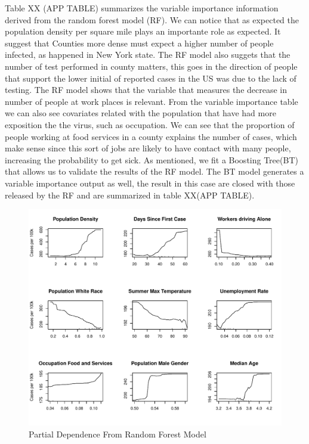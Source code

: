 \documentclass[
]{article}
\begin{document}
Table XX (APP TABLE) summarizes the variable importance information
derived from the random forest model (RF). We can notice that as
expected the population density per square mile plays an importante role
as expected. It suggest that Counties more dense must expect a higher
number of people infected, as happened in New York state. The RF model
also suggets that the number of test performed in county matters, this
goes in the direction of people that support the lower initial of
reported cases in the US was due to the lack of testing. The RF model
shows that the variable that measures the decrease in number of people
at work places is relevant. From the variable importance table we can
also see covariates related with the population that have had more
exposition the the virus, such as occupation. We can see that the
proportion of people working at food services in a county explains the
number of cases, which make sense since this sort of jobs are likely to
have contact with many people, increasing the probability to get sick.
As mentioned, we fit a Boosting Tree(BT) that allows us to validate the
results of the RF model. The BT model generates a variable importance
output as well, the result in this case are closed with those released
by the RF and are summarized in table XX(APP TABLE).

\begin{figure}
\centering
\includegraphics{covid_tree_analysis_files/figure-latex/fig1-1.pdf}
\caption{Partial Dependence From Random Forest Model}
\end{figure}
\end{document}
